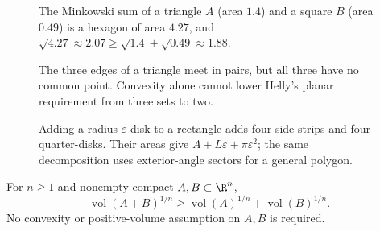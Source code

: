 \begin{figure}[ht]
\centering
{}
\caption{The Minkowski sum of a triangle $A$ (area $1.4$) and a square $B$ (area $0.49$) is a hexagon of area $4.27$, and
$\sqrt{4.27}\approx2.07\ge\sqrt{1.4}+\sqrt{0.49}\approx1.88$.}
\label{geometry:fig:minkowskisum}
\end{figure}

\begin{figure}[ht]
\centering{}
\caption{The three edges of a triangle meet in pairs, but all three have no common point. Convexity alone cannot lower Helly's planar requirement from three sets to two.}
\label{fig:v9-app-j-helly-sharp}
\end{figure}

\begin{figure}[ht]
\centering{}
\caption{Adding a radius-$\varepsilon$ disk to a rectangle adds four side strips and four quarter-disks. Their areas give $A+L\varepsilon+\pi\varepsilon^2$; the same decomposition uses exterior-angle sectors for a general polygon.}
\label{fig:v9-app-j-parallel-body}
\end{figure}

\begin{theorem}\label{geometry:thm:bm}
For $n\ge1$ and nonempty compact $A,B\subset\R^n$,
\[
\operatorname{vol}(A+B)^{1/n}
\ge\operatorname{vol}(A)^{1/n}+\operatorname{vol}(B)^{1/n}.
\]
No convexity or positive-volume assumption on $A,B$ is required.
\end{theorem}

